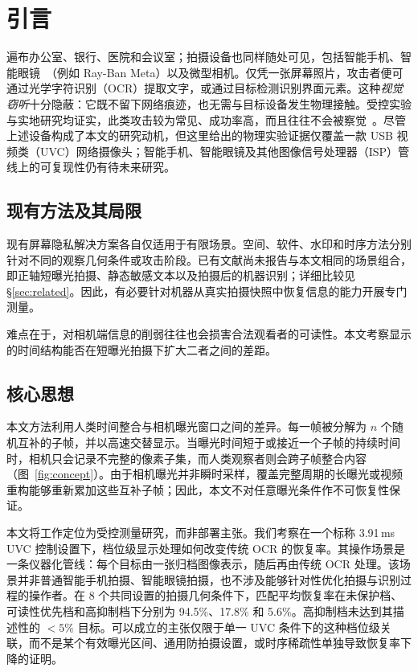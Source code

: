 \documentclass{ieeeaccess}
\begin{document}
\section{引言}

遍布办公室、银行、医院和会议室；拍摄设备也同样随处可见，包括智能手机、智能眼镜~\cite{b_wang2026}（例如 Ray-Ban Meta）以及微型相机。仅凭一张屏幕照片，攻击者便可通过光学字符识别（OCR）提取文字，或通过目标检测识别界面元素。这种\emph{视觉窃听}十分隐蔽：它既不留下网络痕迹，也无需与目标设备发生物理接触。受控实验与实地研究均证实，此类攻击较为常见、成功率高，而且往往不会被察觉~\cite{b_ponemon2016,b_eiband2017}。尽管上述设备构成了本文的研究动机，但这里给出的物理实验证据仅覆盖一款 USB 视频类（UVC）网络摄像头；智能手机、智能眼镜及其他图像信号处理器（ISP）管线上的可复现性仍有待未来研究。

\subsection{现有方法及其局限}

现有屏幕隐私解决方案各自仅适用于有限场景。空间、软件、水印和时序方法分别针对不同的观察几何条件或攻击阶段。已有文献尚未报告与本文相同的场景组合，即正轴短曝光拍摄、静态敏感文本以及拍摄后的机器识别；详细比较见 \S\ref{sec:related}。因此，有必要针对机器从真实拍摄快照中恢复信息的能力开展专门测量。

难点在于，对相机端信息的削弱往往也会损害合法观看者的可读性。本文考察显示的时间结构能否在短曝光拍摄下扩大二者之间的差距。

\subsection{核心思想}

本文方法利用人类时间整合与相机曝光窗口之间的差异。每一帧被分解为 $n$ 个随机互补的子帧，并以高速交替显示。当曝光时间短于或接近一个子帧的持续时间时，相机只会记录不完整的像素子集，而人类观察者则会跨子帧整合内容（图~\ref{fig:concept}）。由于相机曝光并非瞬时采样，覆盖完整周期的长曝光或视频重构能够重新累加这些互补子帧；因此，本文不对任意曝光条件作不可恢复性保证。

本文将工作定位为受控测量研究，而非部署主张。我们考察在一个标称 3.91\,ms UVC 控制设置下，档位级显示处理如何改变传统 OCR 的恢复率。其操作场景是一条仪器化管线：每个目标由一张归档图像表示，随后再由传统 OCR 处理。该场景并非普通智能手机拍摄、智能眼镜拍摄，也不涉及能够针对性优化拍摄与识别过程的操作者。在 8 个共同设置的拍摄几何条件下，匹配平均恢复率在未保护档、可读性优先档和高抑制档下分别为 94.5\%、17.8\% 和 5.6\%。高抑制档未达到其描述性的 $<5\%$ 目标。可以成立的主张仅限于单一 UVC 条件下的这种档位级关联，而不是某个有效曝光区间、通用防拍摄设置，或时序稀疏性单独导致恢复率下降的证明。
\end{document}
